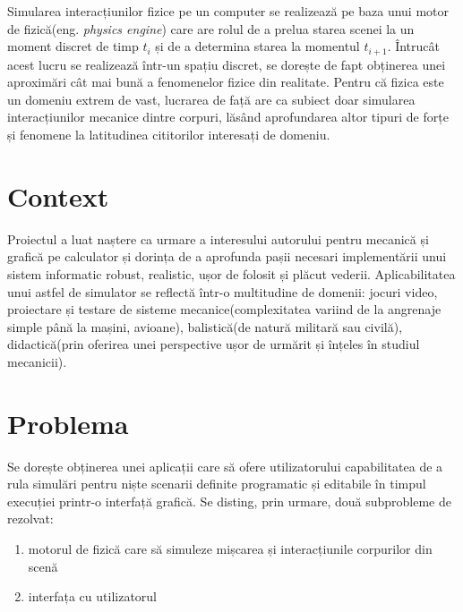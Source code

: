\documentclass[12pt,a4paper]{report}
\newcommand{\worktype}[1]{[\textit{#1}] }
\newcommand{\dezvoltare}{\worktype{Dezvoltare de produs}}
\newcommand{\cercetare}{\worktype{Cercetare}}
\begin{document}
%
Simularea interacțiunilor fizice pe un computer se realizează pe baza unui motor de fizică(eng. \textit{physics engine}) care are rolul de a prelua starea scenei la un moment discret de timp $t_i$ și de a determina starea la momentul $t_{i+1}$. Întrucât acest lucru se realizează într-un spațiu discret, se dorește de fapt obținerea unei aproximări cât mai bună a fenomenelor fizice din realitate. Pentru că fizica este un domeniu extrem de vast, lucrarea de față are ca subiect doar simularea interacțiunilor mecanice dintre corpuri, lăsând aprofundarea altor tipuri de forțe și fenomene la latitudinea cititorilor interesați de domeniu. 
\section{Context}
Proiectul a luat naștere ca urmare a interesului autorului pentru mecanică și grafică pe calculator și dorința de a aprofunda pașii necesari implementării unui sistem informatic robust, realistic, ușor de folosit și plăcut vederii.
Aplicabilitatea unui astfel de simulator se reflectă într-o multitudine de domenii: jocuri video, proiectare și testare de sisteme mecanice(complexitatea variind de la angrenaje simple până la mașini, avioane), balistică(de natură militară sau civilă), didactică(prin oferirea unei perspective ușor de urmărit și înțeles în studiul mecanicii).
\section{Problema} 
Se dorește obținerea unei aplicații care să ofere utilizatorului capabilitatea de a rula simulări pentru niște scenarii definite programatic și editabile în timpul execuției printr-o interfață grafică.
Se disting, prin urmare, două subprobleme de rezolvat:
\begin{enumerate}
	\item motorul de fizică care să simuleze mișcarea și interacțiunile corpurilor din scenă
	\item interfața cu utilizatorul
\end{enumerate}
\end{document}
